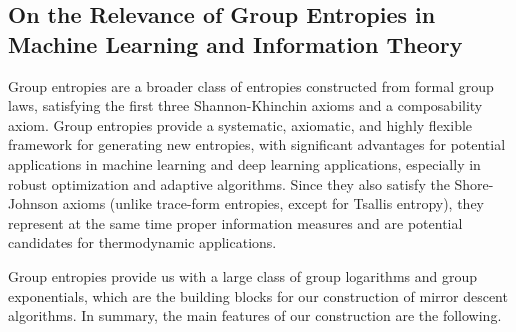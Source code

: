 \documentclass[10pt]{amsart}
\newcommand{\tcb}{\textcolor{blue}}
\theoremstyle{definition}
\theoremstyle{definition}	 %
\begin{document}
\subsection {On the Relevance of Group Entropies in Machine Learning and Information Theory}
Group entropies are a broader class of entropies constructed from formal group laws, satisfying the first three Shannon-Khinchin axioms and a composability axiom. Group entropies provide a systematic, axiomatic, and highly flexible framework for generating new entropies, with significant advantages for potential applications in  machine learning and deep learning applications, especially in robust optimization and adaptive algorithms.
Since they also satisfy the Shore-Johnson axioms (unlike trace-form entropies, except for Tsallis entropy), they represent at the same time proper information measures and are potential candidates for thermodynamic applications.

Group entropies provide us with a large class of group logarithms and group exponentials, which are the building blocks for our construction of mirror descent algorithms.
In summary, the main features of our construction are the following.
\end{document}
